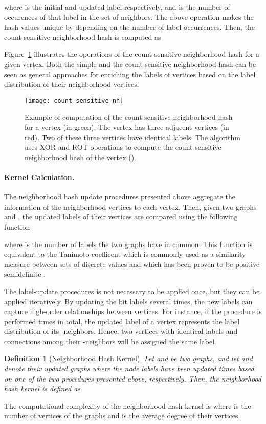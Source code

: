 \documentclass[twoside,11pt]{article}
\newtheorem{definition}{Definition}
\begin{document}
where  is the initial and updated label respectively, and  is the number of occurences of that label in the set of neighbors.
The above operation makes the hash values unique by depending on the number of label occurrences.
Then, the count-sensitive neighborhood hash is computed as

Figure~\ref{fig:count_sensitive_nh} illustrates the operations of the count-sensitive neighborhood hash for a given vertex.
Both the simple and the count-sensitive neighborhood hash can be seen as general approaches for enriching the labels of vertices based on the label distribution of their neighborhood vertices.

\begin{figure}[t]
  \centering
  \texttt{[image: count\_sensitive\_nh]}
  \caption{Example of computation of the count-sensitive neighborhood hash for a vertex (in green). The vertex has three adjacent vertices (in red). Two of these three vertices have identical labels. The algorithm uses XOR and ROT operations to compute the count-sensitive neighborhood hash of the vertex ().}
  \label{fig:count_sensitive_nh}
\end{figure}

\paragraph{Kernel Calculation.}
The neighborhood hash update procedures presented above aggregate the information of the neighborhood vertices to each vertex.
Then, given two graphs  and , the updated labels of their vertices are compared using the following function

where  is the number of labels the two graphs have in common.
This function is equivalent to the Tanimoto coefficent which is commonly used as a similarity measure between sets of discrete values and which has been proven to be positive semidefinite \cite{gower1971general}.

The label-update procedures is not necessary to be applied once, but they can be applied iteratively.
By updating the bit labels several times, the new labels can capture high-order relationships between vertices.
For instance, if the procedure is performed  times in total, the updated label  of a vertex  represents the label distribution of its -neighbors.
Hence, two vertices  with identical labels and connections among their -neighbors will be assigned the same label.

\begin{definition}[Neighborhood Hash Kernel]
	Let  and  be two graphs, and let  and  denote their updated graphs where the node labels have been updated  times based on one of the two procedures presented above, respectively.
	Then, the neighborhood hash kernel is defined as
	
\end{definition}
The computational complexity of the neighborhood hash kernel is  where  is the number of vertices of the graphs and  is the average degree of their vertices.
\end{document}
